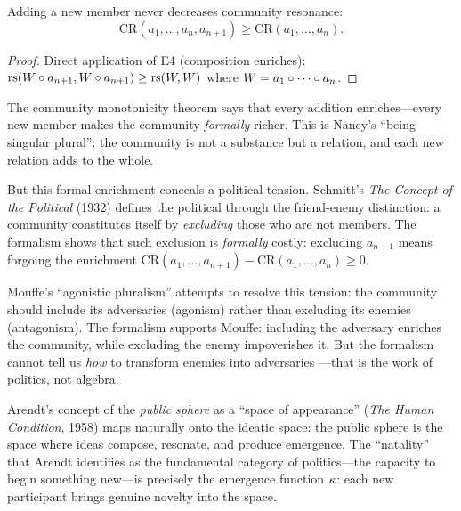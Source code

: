 \begin{theorem}
\label{thm:community-mono}
Adding a new member never decreases community resonance:
\[
\mathrm{CR}(a_1, \ldots, a_n, a_{n+1}) \geq \mathrm{CR}(a_1, \ldots, a_n).
\]
\end{theorem}

\begin{proof}
Direct application of E4 (composition enriches):
$\mathrm{rs}(W \circ a_{n+1}, W \circ a_{n+1}) \geq \mathrm{rs}(W, W)$
where $W = a_1 \circ \cdots \circ a_n$.
\end{proof}

\begin{interpretation}
The community monotonicity theorem says that every addition enriches---every
new member makes the community \emph{formally} richer. This is Nancy's
``being singular plural'': the community is not a substance but a relation,
and each new relation adds to the whole.

But this formal enrichment conceals a political tension. Schmitt's
\emph{The Concept of the Political} (1932) defines the political through the
friend-enemy distinction: a community constitutes itself by \emph{excluding}
those who are not members. The formalism shows that such exclusion is
\emph{formally} costly: excluding $a_{n+1}$ means forgoing the enrichment
$\mathrm{CR}(a_1, \ldots, a_{n+1}) - \mathrm{CR}(a_1, \ldots, a_n) \geq 0$.

Mouffe's ``agonistic pluralism'' attempts to resolve this tension: the
community should include its adversaries (agonism) rather than excluding its
enemies (antagonism). The formalism supports Mouffe: including the adversary
enriches the community, while excluding the enemy impoverishes it. But the
formalism cannot tell us \emph{how} to transform enemies into adversaries
---that is the work of politics, not algebra.

Arendt's concept of the \emph{public sphere} as a ``space of appearance''
(\textit{The Human Condition}, 1958) maps naturally onto the ideatic space:
the public sphere is the space where ideas compose, resonate, and produce
emergence. The ``natality'' that Arendt identifies as the fundamental
category of politics---the capacity to begin something new---is precisely
the emergence function $\kappa$: each new participant brings genuine
novelty into the space.
\end{interpretation}



